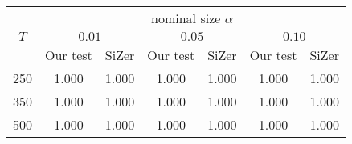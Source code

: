 % 
\begin{tabular}{|c|cc|cc|cc|}
  \hline
  & \multicolumn{6}{|c|}{nominal size $\alpha$} \\
 \cline{2-7} $T$ & \multicolumn{2}{|c|}{$0.01$} & \multicolumn{2}{|c|}{$0.05$} & \multicolumn{2}{|c|}{$0.10$} \\
  & Our test & SiZer & Our test & SiZer & Our test & SiZer \\
 \hline
250 & 1.000 & 1.000 & 1.000 & 1.000 & 1.000 & 1.000 \\ 
  350 & 1.000 & 1.000 & 1.000 & 1.000 & 1.000 & 1.000 \\ 
  500 & 1.000 & 1.000 & 1.000 & 1.000 & 1.000 & 1.000 \\ 
   \hline
\end{tabular}
